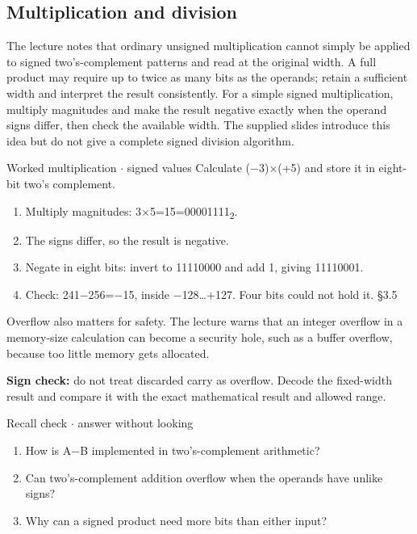 \documentclass[11pt]{article}
\begin{document}
\begin{keepsection}
\begin{keepsection}
\subsection{Multiplication and division}

The lecture notes that ordinary unsigned multiplication cannot simply be applied to signed two’s-complement patterns and read at the original width. A full product may require up to twice as many bits as the operands; retain a sufficient width and interpret the result consistently. For a simple signed multiplication, multiply magnitudes and make the result negative exactly when the operand signs differ, then check the available width. The supplied slides introduce this idea but do not give a complete signed division algorithm.

\begin{workedbox}{Worked multiplication \ensuremath{\cdot} signed values}
Calculate (\ensuremath{-}3)\ensuremath{\times}(+5) and store it in eight-bit two’s complement.

\begin{enumerate}
\item Multiply magnitudes: 3\ensuremath{\times}5=15=00001111\textsubscript{2}.
\item The signs differ, so the result is negative.
\item Negate in eight bits: invert to 11110000 and add 1, giving 11110001.
\item Check: 241\ensuremath{-}256=\ensuremath{-}15, inside \ensuremath{-}128…+127. Four bits could not hold it. \hfill{\small\color{FAUblue}§3.5}
\end{enumerate}
\end{workedbox}

Overflow also matters for safety. The lecture warns that an integer overflow in a memory-size calculation can become a security hole, such as a buffer overflow, because too little memory gets allocated.

\begin{notebox}\textbf{Sign check:} do not treat discarded carry as overflow. Decode the fixed-width result and compare it with the exact mathematical result and allowed range.\end{notebox}

\begin{recallbox}{Recall check \ensuremath{\cdot} answer without looking}
\begin{enumerate}
\item How is A\ensuremath{-}B implemented in two’s-complement arithmetic?
\item Can two’s-complement addition overflow when the operands have unlike signs?
\item Why can a signed product need more bits than either input?
\end{enumerate}


\end{recallbox}
\end{keepsection}
\end{keepsection}
\end{document}
